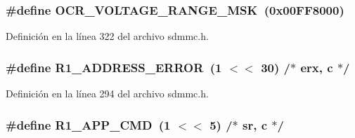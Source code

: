 \subsubsection[{\texorpdfstring{O\+C\+R\+\_\+\+V\+O\+L\+T\+A\+G\+E\+\_\+\+R\+A\+N\+G\+E\+\_\+\+M\+SK}{OCR_VOLTAGE_RANGE_MSK}}]{\setlength{\rightskip}{0pt plus 5cm}\#define O\+C\+R\+\_\+\+V\+O\+L\+T\+A\+G\+E\+\_\+\+R\+A\+N\+G\+E\+\_\+\+M\+SK~(0x00\+F\+F8000)}\hypertarget{group___c_h_i_p___s_d_m_m_c___definitions_gab2942fd3806a958856a9ade4d0843b87}{}\label{group___c_h_i_p___s_d_m_m_c___definitions_gab2942fd3806a958856a9ade4d0843b87}


Definición en la línea 322 del archivo sdmmc.\+h.

\subsubsection[{\texorpdfstring{R1\+\_\+\+A\+D\+D\+R\+E\+S\+S\+\_\+\+E\+R\+R\+OR}{R1_ADDRESS_ERROR}}]{\setlength{\rightskip}{0pt plus 5cm}\#define R1\+\_\+\+A\+D\+D\+R\+E\+S\+S\+\_\+\+E\+R\+R\+OR~(1 $<$$<$ 30)	/$\ast$ erx, c $\ast$/}\hypertarget{group___c_h_i_p___s_d_m_m_c___definitions_ga84256fd9d0fbf84f1c8fabd17d3f7adc}{}\label{group___c_h_i_p___s_d_m_m_c___definitions_ga84256fd9d0fbf84f1c8fabd17d3f7adc}


Definición en la línea 294 del archivo sdmmc.\+h.

\subsubsection[{\texorpdfstring{R1\+\_\+\+A\+P\+P\+\_\+\+C\+MD}{R1_APP_CMD}}]{\setlength{\rightskip}{0pt plus 5cm}\#define R1\+\_\+\+A\+P\+P\+\_\+\+C\+MD~(1 $<$$<$ 5)	/$\ast$ sr, c $\ast$/}\hypertarget{group___c_h_i_p___s_d_m_m_c___definitions_gadc3731837f30501aecdd3f9baa6ca8f8}{}\label{group___c_h_i_p___s_d_m_m_c___definitions_gadc3731837f30501aecdd3f9baa6ca8f8}


